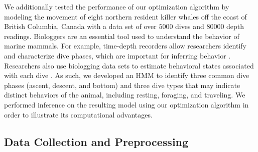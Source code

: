 
We additionally tested the performance of our optimization algorithm by modeling the movement of eight northern resident killer whales off the coast of British Columbia, Canada with a data set of over $5000$ dives and $80000$ depth readings. Biologgers are an essential tool used to understand the behavior of marine mammals. For example, time-depth recorders allow researchers identify and characterize dive phases, which are important for inferring behavior \citep[e.g., prey capture often occurs in the bottom phase of a foraging dive,][]{Wright:2017,Jensen:2023}. Researchers also use biologging data sets to estimate behavioral states associated with each dive \citep[e.g. foraging, resting, and traveling,][]{Tennessen:2023}. As such, we developed an HMM to identify three common dive phases (ascent, descent, and bottom) and three dive types that may indicate distinct behaviors of the animal, including resting, foraging, and traveling. We performed inference on the resulting model using our optimization algorithm in order to illustrate its computational advantages.

\subsection{Data Collection and Preprocessing}

